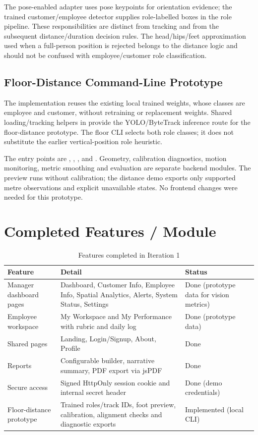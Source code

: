 The pose-enabled adapter uses pose keypoints for orientation evidence; the trained customer/employee detector supplies role-labelled boxes in the role pipeline. These responsibilities are distinct from tracking and from the subsequent distance/duration decision rules. The head/hips/feet approximation used when a full-person position is rejected belongs to the distance logic and should not be confused with employee/customer role classification.

\subsection{Floor-Distance Command-Line Prototype}
The implementation reuses the existing local trained  weights, whose classes are employee and customer, without retraining or replacement weights. Shared loading/tracking helpers in  provide the YOLO/ByteTrack inference route for the floor-distance prototype. The floor CLI selects both role classes; it does not substitute the earlier vertical-position role heuristic.

The entry points are , , , and . Geometry, calibration diagnostics, motion monitoring, metric smoothing and evaluation are separate backend modules. The preview runs without calibration; the distance demo exports only supported metre observations and explicit unavailable states. No frontend changes were needed for this prototype.

\section{Completed Features / Module}
\begin{table}[H]
\centering
\caption{Features completed in Iteration 1}
\begin{tabular}{P{0.3\textwidth}P{0.4\textwidth}P{0.17\textwidth}}
\toprule
Feature & Detail & Status\\
\midrule
Manager dashboard pages & Dashboard, Customer Info, Employee Info, Spatial Analytics, Alerts, System Status, Settings & Done (prototype data for vision metrics)\\
Employee workspace & My Workspace and My Performance with rubric and daily log & Done (prototype data)\\
Shared pages & Landing, Login/Signup, About, Profile & Done\\
Reports & Configurable builder, narrative summary, PDF export via jsPDF & Done\\
Secure access & Signed HttpOnly session cookie and internal secret header & Done (demo credentials)\\
Floor-distance prototype & Trained roles/track IDs, foot preview, calibration, alignment checks and diagnostic exports & Implemented (local CLI)\\
\bottomrule
\end{tabular}
\end{table}

